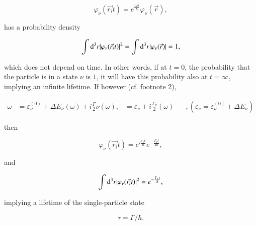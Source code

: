 \documentclass[a4paper,14pt]{book}
\begin{document}
\begin{equation}
\varphi_{\nu}(\vec{r_i}t) = e^{\frac{i\omega t}{\hbar}} \varphi_{\nu}(\vec{r}) ,
\label{eqn:43}
\end{equation}

\noindent has a probability density

\begin{equation}
\int{\rm d}^3 r |\varphi_{\nu}(\vec{r_i}t)|^2 = \int{\rm d}^3 r |\varphi_{\nu}(\vec{r})| = 1 ,
\label{eqn:44}
\end{equation}

\noindent which does not depend on time. In other words, if at $t=0$, the probability that the particle is in a state $\nu$ is $1$, it will have this probability also at $t=\infty$, implying an infinite lifetime. If however (cf. footnote 2),

\begin{eqnarray}
\nonumber
\omega &= \varepsilon_{\nu}^{(0)} + \Delta E_{\nu}(\omega) + i \frac{\Gamma}{2} \nu(\omega),
\nonumber
&= \varepsilon_{\nu} + i \frac{\Gamma_{\nu}}{2}(\omega) \;\;\;\;\;\; , (\varepsilon_{\nu} = \varepsilon_{\nu}^{(0)} + \Delta E_{\nu})
\end{eqnarray}

\noindent then

\begin{equation}
\nonumber
\varphi_{\nu}(\vec{r_i} t) = e^{i \frac{\varepsilon_{\nu} t}{\hbar}} e^{- \frac{\Gamma_{\nu} t}{2\hbar}} ,
\end{equation}

\noindent and

\begin{equation}
\int{\rm d}^3 r |\varphi_{\nu} (\vec{r_i} t)|^2 = e^{- \frac{\Gamma_{\nu} t}{\hbar}} ,
\label{eqn:44b}
\end{equation}

\noindent implying a lifetime of the single-particle state

\begin{equation}
\tau = \Gamma/\hbar .
\label{eqn:45}
\end{equation}
\end{document}
